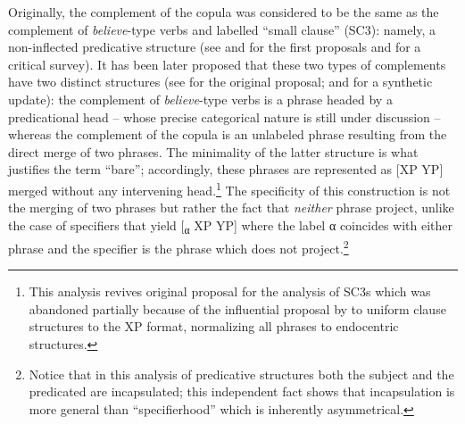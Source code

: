 \documentclass[output=paper]{langsci/langscibook}
\begin{document}
Originally, the complement of the copula was considered to be the same as the
complement of \emph{believe}-type verbs and labelled “small clause”
(\gls{SC3}): namely, a non-inflected predicative structure (see
\citealt{Williams1975} and \citealt{Stowell1978} for the first proposals and
\citealt{Graffi2001} for a critical survey). It has been later proposed that
these two types of complements have two distinct structures (see
\citealt{Moro1997} for the original proposal; and \citealt{Moro2017a,Moro2017b}
for a synthetic update): the complement of \emph{believe}-type verbs is a
phrase headed by a predicational head – whose precise categorical nature is
still under discussion – whereas the complement of the copula is an unlabeled
phrase resulting from the direct merge of two phrases. The minimality of the
latter structure is what justifies the term “bare”; accordingly, these phrases
are represented as [XP YP] merged without any intervening head.\footnote{This
    analysis revives  original proposal for the analysis
of \glspl{SC3} which was abandoned partially because of the influential proposal by
 to uniform clause structures to the XP format,
normalizing all phrases to endocentric structures.}  The specificity of this
construction is not the merging of two phrases but rather the fact that
\emph{neither} phrase project, unlike the case of specifiers that yield
[\textsubscript{α} XP YP] where the label α coincides with
either phrase and the specifier is the phrase which does not
project.\footnote{Notice that in this analysis of predicative structures both
    the subject and the predicated are incapsulated; this independent fact
    shows that incapsulation is more general than “specifierhood” which is
inherently asymmetrical.}
\end{document}
